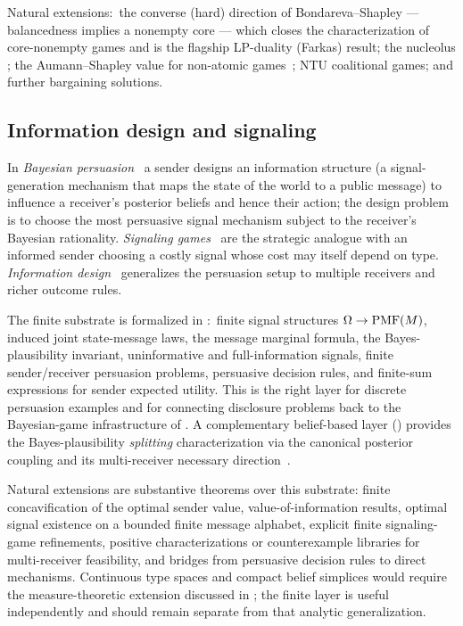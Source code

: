 Natural extensions:\ the converse (hard) direction of
Bondareva–Shapley \citep{Bondareva1963, Shapley1967} — balancedness
implies a nonempty core — which closes the characterization of
core-nonempty games and is the flagship LP-duality (Farkas) result;
the nucleolus \citep{Schmeidler1969}; the Aumann–Shapley value for non-atomic
games~\citep{AumannShapley1974}; NTU coalitional games; and further
bargaining solutions.

\subsection{Information design and signaling}
\label{sec:future:info-design}

In \emph{Bayesian persuasion}~\citep{KamenicaGentzkow2011} a
sender designs an information structure (a signal-generation
mechanism that maps the state of the world to a public message)
to influence a receiver's posterior beliefs and hence their
action; the design problem is to choose the most persuasive
signal mechanism subject to the receiver's Bayesian rationality.
\emph{Signaling games}~\citep{Spence1973} are the strategic
analogue with an informed sender choosing a costly signal whose
cost may itself depend on type.  \emph{Information
design}~\citep{Bergemann2019} generalizes the persuasion setup to
multiple receivers and richer outcome rules.

The finite substrate is formalized in
:\ finite signal structures
$\Omega \to \mathrm{PMF}(M)$, induced joint state-message laws, the
message marginal formula, the Bayes-plausibility invariant,
uninformative and full-information signals, finite sender/receiver
persuasion problems, persuasive decision rules, and finite-sum
expressions for sender expected utility.  This is the right layer
for discrete persuasion examples and for connecting disclosure
problems back to the Bayesian-game infrastructure of
.  A complementary belief-based layer
() provides the Bayes-plausibility
\emph{splitting} characterization via the canonical posterior coupling
and its multi-receiver necessary direction~\citep{Arieli2021}.

Natural extensions are substantive theorems over this substrate:
finite concavification of the optimal sender value, value-of-information
results, optimal signal existence on a bounded finite message alphabet,
explicit finite signaling-game refinements, positive characterizations
or counterexample libraries for multi-receiver feasibility, and bridges
from persuasive decision rules to direct mechanisms.  Continuous type spaces and compact belief simplices
would require the measure-theoretic extension discussed in
; the finite layer is useful independently
and should remain separate from that analytic generalization.

